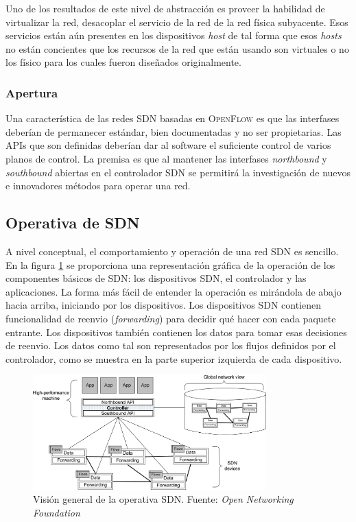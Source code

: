 \documentclass[10pt,journal,compsoc]{IEEEtran}
\begin{document}
Uno de los resultados de este nivel de abstracción es proveer la habilidad de virtualizar la red, desacoplar el servicio de la red de la red física subyacente. Esos servicios están aún presentes en los dispositivos \emph{host} de tal forma que esos \emph{hosts} no están concientes que los recursos de la red que están usando son virtuales o no los físico para los cuales fueron diseñados originalmente.

\subsubsection{Apertura}
Una característica de las redes SDN basadas en \textsc{OpenFlow} es que las interfases deberían de permanecer estándar, bien documentadas y no ser propietarias. Las APIs que son definidas deberían dar al software el suficiente control de varios planos de control. La premisa es que al mantener las interfases \emph{northbound} y \emph{southbound} abiertas en el controlador SDN se permitirá la investigación de nuevos e innovadores métodos para operar una red.

\subsection{Operativa de SDN}
A nivel conceptual, el comportamiento y operación de una red SDN es sencillo. En la figura \ref{fig:operation-sdn} se proporciona una representación gráfica de la operación de los componentes básicos de SDN: los dispositivos SDN, el controlador y las aplicaciones. La forma más fácil de entender la operación es mirándola de abajo hacia arriba, iniciando por los dispositivos. Los dispositivos SDN contienen funcionalidad de reenvio (\emph{forwarding}) para decidir qué hacer con cada paquete entrante. Los dispositivos también contienen los datos para tomar esas decisiones de reenvio. Los datos como tal son representados por los flujos definidos por el controlador, como se muestra en la parte superior izquierda de cada dispositivo.

\begin{figure}[h]
    \centering
    \includegraphics[width=9cm]{operation-sdn}
    \caption{Visión general de la operativa SDN. Fuente: \emph{Open Networking Foundation}}
    \label{fig:operation-sdn}
\end{figure}
\end{document}
